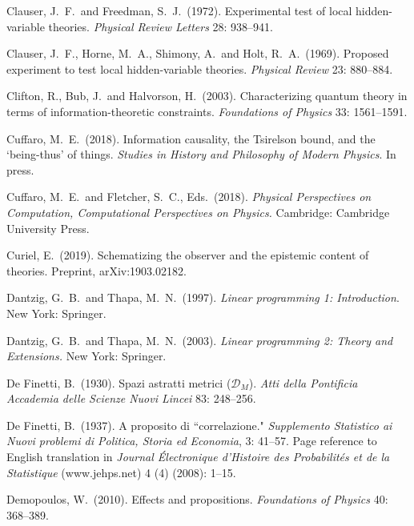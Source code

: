 \documentclass[12pt]{article}
\numberwithin{equation}{section}
\begin{document}
\begin{thebibliography}{}
 Clauser, J.\ F.\ and Freedman, S.\ J.\ (1972). Experimental test of local hidden-variable theories. \emph{Physical Review Letters} 28: 938--941.

 Clauser, J.\ F., Horne, M.\ A., Shimony, A.\ and Holt, R.\ A.\ (1969). Proposed experiment to test local hidden-variable theories. \emph{Physical Review} 23: 880--884.

 Clifton, R., Bub, J.\ and Halvorson, H.\ (2003). Characterizing quantum theory in terms of information-theoretic constraints. \emph{Foundations of Physics} 33: 1561--1591.

 Cuffaro, M.\, E.\ (2018). Information causality, the Tsirelson bound, and the `being-thus' of things. \emph{Studies in History and Philosophy of Modern Physics}. In press.

 Cuffaro, M.\ E.\  and Fletcher, S.\ C., Eds.\ (2018). \emph{Physical Perspectives on Computation, Computational Perspectives on Physics.} Cambridge: Cambridge University Press.

 Curiel, E.\ (2019). Schematizing the observer and the epistemic content of theories. Preprint, {arXiv:1903.02182}.

  Dantzig, G.\ B.\ and Thapa, M.\ N.\ (1997). \emph{Linear programming 1: Introduction}. New York: Springer.

 Dantzig, G.\ B.\ and Thapa, M.\ N.\ (2003). \emph{Linear programming 2: Theory and Extensions.} New York: Springer.

 De Finetti, B.\ (1930). Spazi astratti metrici ($\mathcal{D}_M$). \emph{Atti della Pontificia Accademia delle Scienze Nuovi Lincei} 83: 248--256.

 De Finetti, B.\ (1937). A proposito di ``correlazione." \emph{Supplemento Statistico ai Nuovi problemi di Politica, Storia ed Economia}, 3:  41--57. Page reference to English translation in \emph{Journal \'Electronique d'Histoire des Probabilit\'es et de la Statistique} (www.jehps.net) 4 (4) (2008): 1--15.

  Demopoulos, W.\ (2010). Effects and propositions. \emph{Foundations of Physics} 40: 368--389.


\end{thebibliography}
\end{document}
